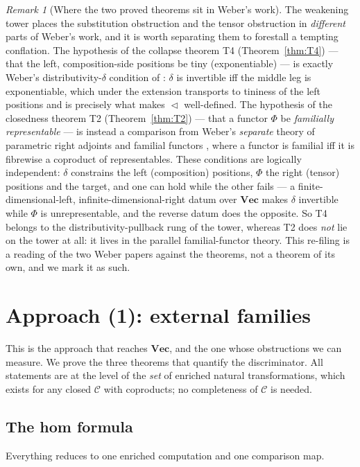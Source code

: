 \documentclass[11pt]{amsart}
\theoremstyle{plain}
\theoremstyle{definition}
\theoremstyle{remark}
\newtheorem{remark}[theorem]{Remark}
\newcommand{\C}{\mathcal{C}}
\newcommand{\Vect}{\mathbf{Vec}}
\renewcommand{\lhd}{\vartriangleleft}
\begin{document}
\begin{remark}[Where the two proved theorems sit in Weber's work]\label{rem:weberrefile}
The weakening tower places the substitution obstruction and the tensor obstruction in \emph{different}
parts of Weber's work, and it is worth separating them to forestall a tempting conflation. The
hypothesis of the collapse theorem T4 (Theorem~\ref{thm:T4}) --- that the left, composition-side
positions be tiny (exponentiable) --- is exactly Weber's distributivity-$\delta$ condition of
\cite{WeberPoly}: $\delta$ is invertible iff the middle leg is exponentiable, which under the
extension transports to tininess of the left positions and is precisely what makes $\lhd$
well-defined. The hypothesis of the closedness theorem T2 (Theorem~\ref{thm:T2}) --- that a
functor $\Phi$ be \emph{familially representable} --- is instead a comparison from Weber's
\emph{separate} theory of parametric right adjoints and familial functors \cite{WeberFamilial}, where a
functor is familial iff it is fibrewise a coproduct of representables. These conditions are logically
independent: $\delta$ constrains the left (composition) positions, $\Phi$ the right (tensor) positions
and the target, and one can hold while the other fails --- a finite-dimensional-left,
infinite-dimensional-right datum over $\Vect$ makes $\delta$ invertible while $\Phi$ is unrepresentable,
and the reverse datum does the opposite. So T4 belongs to the distributivity-pullback rung of the
tower, whereas T2 does \emph{not} lie on the tower at all: it lives in the parallel familial-functor
theory. This re-filing is a reading of the two Weber papers against the theorems, not a theorem of its
own, and we mark it as such.
\end{remark}

\section{Approach (1): external families}\label{sec:external}

This is the approach that reaches $\Vect$, and the one whose obstructions we can measure. We prove
the three theorems that quantify the discriminator. All statements are at the level of the
\emph{set} of enriched natural transformations, which exists for any closed $\C$ with coproducts; no
completeness of $\C$ is needed.

\subsection{The hom formula}
Everything reduces to one enriched computation and one comparison map.
\end{document}
